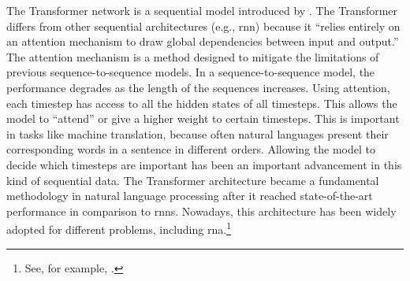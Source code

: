 

The Transformer network is a sequential model introduced by
\textcite{vaswani2017attention}. The Transformer differs
from other sequential architectures (e.g., \gls{rnn})
because it ``relies entirely on an attention mechanism to
draw global dependencies between input and output.'' The
attention mechanism is a method designed to mitigate the
limitations of previous sequence-to-sequence models. In a
sequence-to-sequence model, the performance degrades as the
length of the sequences increases. Using attention, each
timestep has access to all the hidden states of all
timesteps. This allows the model to ``attend'' or give a
higher weight to certain timesteps. This is important in
tasks like machine translation, because often natural
languages present their corresponding words in a sentence in
different orders. Allowing the model to decide which
timesteps are important has been an important advancement in
this kind of sequential data. The Transformer architecture
became a fundamental methodology in natural language
processing after it reached state-of-the-art performance in
comparison to \glspl{rnn}. Nowadays, this architecture has
been widely adopted for different problems, including
\gls{rna}.\footnote{See, for example,
\textcite{chen2021attend}.}
